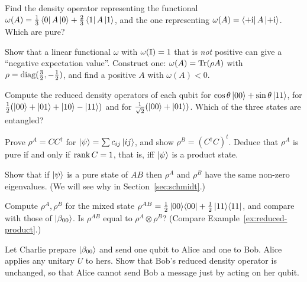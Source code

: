\begin{exerciseset}
   Find the density operator representing the functional $\omega(A)=\tfrac13\left\langle0\right|A\left|0\right\rangle+\tfrac23\left\langle1\right|A\left|1\right\rangle$, and the one representing $\omega(A)=\left\langle+\mathrm{i}\right|A\left|+\mathrm{i}\right\rangle$. Which are pure?

   Show that a linear functional $\omega$ with $\omega(\mathbb{I})=1$ that is \emph{not} positive can give a ``negative expectation value''. Construct one: $\omega(A)=\operatorname{Tr}(\rho A)$ with $\rho=\operatorname{diag}(\tfrac32,-\tfrac12)$, and find a positive $A$ with $\omega(A)<0$.

   Compute the reduced density operators of each qubit for $\cos\theta\left|00\right\rangle+\sin\theta\left|11\right\rangle$, for $\frac12(\left|00\right\rangle+\left|01\right\rangle+\left|10\right\rangle-\left|11\right\rangle)$ and for $\frac1{\sqrt2}(\left|00\right\rangle+\left|01\right\rangle)$. Which of the three states are entangled?

   Prove $\rho^A=CC^\dagger$ for $\left|\psi\right\rangle=\sum c_{ij}\left|ij\right\rangle$, and show $\rho^B=(C^\dagger C)^t$. Deduce that $\rho^A$ is pure if and only if $\operatorname{rank} C=1$, that is, iff $\left|\psi\right\rangle$ is a product state.

   Show that if $\left|\psi\right\rangle$ is a pure state of $AB$ then $\rho^A$ and $\rho^B$ have the same non-zero eigenvalues. (We will see why in Section~\ref{sec:schmidt}.)

   Compute $\rho^A,\rho^B$ for the mixed state $\rho^{AB}=\tfrac12\left|00\right\rangle\!\left\langle00\right|+\tfrac12\left|11\right\rangle\!\left\langle11\right|$, and compare with those of $\left|\beta_{00}\right\rangle$. Is $\rho^{AB}$ equal to $\rho^A\otimes\rho^B$? (Compare Example~\ref{ex:reduced-product}.)

   Let Charlie prepare $\left|\beta_{00}\right\rangle$ and send one qubit to Alice and one to Bob. Alice applies any unitary $U$ to hers. Show that Bob's reduced density operator is unchanged, so that Alice cannot send Bob a message just by acting on her qubit.
\end{exerciseset}
